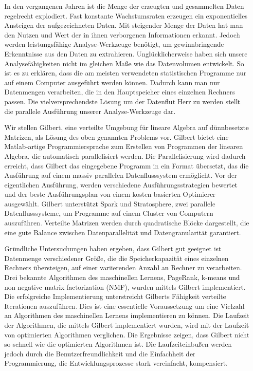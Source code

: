 \clearemptydoublepage
{}
{}	


\vspace*{2cm}
\begin{center}
\end{center}
\vspace{1cm}

In den vergangenen Jahren ist die Menge der erzeugten und gesammelten Daten regelrecht explodiert.
Fast konstante Wachstumsraten erzeugen ein exponentielles Ansteigen der aufgezeichneten Daten.
Mit steigender Menge der Daten hat man den Nutzen und Wert der in ihnen verborgenen Informationen erkannt.
Jedoch werden leistungsfähige Analyse-Werkzeuge benötigt, um gewinnbringende Erkenntnisse aus den Daten zu extrahieren.
Unglücklicherweise haben sich unsere Analysefähigkeiten nicht im gleichen Maße wie das Datenvolumen entwickelt.
So ist es zu erklären, dass die am meisten verwendeten statistischen Programme nur auf einem Computer ausgeführt werden können.
Dadurch kann man nur Datenmengen verarbeiten, die in den Hauptspeicher eines einzelnen Rechners passen.
Die vielversprechendste Lösung um der Datenflut Herr zu werden stellt die parallele Ausführung unserer Analyse-Werkzeuge dar.

Wir stellen Gilbert, eine verteilte Umgebung für lineare Algebra auf dünnbesetzte Matrizen, als Lösung des oben genannten Problems vor.
Gilbert bietet eine Matlab-artige Programmiersprache zum Erstellen von Programmen der linearen Algebra, die automatisch parallelisiert werden.
Die Parallelisierung wird dadurch erreicht, dass Gilbert das eingegebene Programm in ein Format übersetzt, das die Ausführung auf einem massiv parallelen Datenflusssystem ermöglicht.
Vor der eigentlichen Ausführung, werden verschiedene Ausführungsstrategien bewertet und der beste Ausführungsplan von einem kosten-basierten Optimierer ausgewählt.
Gilbert unterstützt Spark und Stratosphere, zwei parallele Datenflusssysteme, um Programme auf einem Cluster von Computern auszuführen.
Verteilte Matrizen werden durch quadratische Blöcke dargestellt, die eine gute Balance zwischen Datenparallelität und Datengranularität garantiert.

Gründliche Untersuchungen haben ergeben, dass Gilbert gut geeignet ist Datenmenge verschiedener Größe, die die Speicherkapazität eines einzelnen Rechners übersteigen, auf einer variierenden Anzahl an Rechner zu verarbeiten.
Drei bekannte Algorithmen des maschinellen Lernens, PageRank, k-means und non-negative matrix factorization (NMF), wurden mittels Gilbert implementiert.
Die erfolgreiche Implementierung unterstreicht Gilberts Fähigkeit verteilte Iterationen auszuführen.
Dies ist eine essentielle Voraussetzung um eine Vielzahl an Algorithmen des maschinellen Lernens implementieren zu können.
Die Laufzeit der Algorithmen, die mittels Gilbert implementiert wurden, wird mit der Laufzeit von optimierten Algorithmen verglichen.
Die Ergebnisse zeigen, dass Gilbert nicht so schnell wie die optimierten Algorithmen ist.
Die Laufzeiteinbußen werden jedoch durch die Benutzerfreundlichkeit und die Einfachheit der Programmierung, die Entwicklungsprozesse stark vereinfacht, kompensiert.